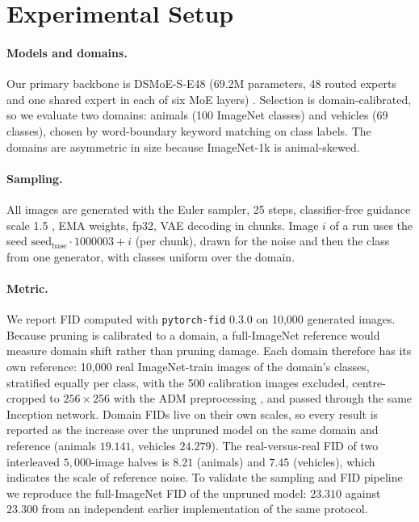 \section{Experimental Setup}\label{sec:exp}

\paragraph{Models and domains.}
Our primary backbone is DSMoE-S-E48 (69.2M parameters, 48 routed experts and one shared expert in each of six MoE layers) \citep{liu2025dsmoe}. 
Selection is domain-calibrated, so we evaluate two domains: animals (100 ImageNet classes) and vehicles (69 classes), chosen by word-boundary keyword matching on class labels. The domains are asymmetric in size because ImageNet-1k is animal-skewed.

\paragraph{Sampling.}
All images are generated with the Euler sampler, 25 steps, classifier-free guidance scale 1.5 \citep{ho2022cfg}, EMA weights, fp32, VAE decoding in chunks. Image $i$ of a run uses the seed $\text{seed}_{\text{base}}\cdot 1000003+i$ (per chunk), drawn for the noise and then the class from one generator, with classes uniform over the domain.

\paragraph{Metric.}
We report FID \citep{heusel2017fid} computed with \texttt{pytorch-fid} 0.3.0 \citep{seitzer2020pytorchfid} on 10{,}000 generated images. Because pruning is calibrated to a domain, a full-ImageNet reference would measure domain shift rather than pruning damage. Each domain therefore has its own reference: 10{,}000 real ImageNet-train images of the domain's classes, stratified equally per class, with the 500 calibration images excluded, centre-cropped to $256\times256$ with the ADM preprocessing \citep{dhariwal2021adm}, and passed through the same Inception network.
Domain FIDs live on their own scales, so every result is reported as the increase over the unpruned model on the same domain and reference (animals $19.141$, vehicles $24.279$). The real-versus-real FID of two interleaved $5{,}000$-image halves is $8.21$ (animals) and $7.45$ (vehicles), which indicates the scale of reference noise.
To validate the sampling and FID pipeline we reproduce the full-ImageNet FID of the unpruned model: $23.310$ against $23.300$ from an independent earlier implementation of the same protocol.

